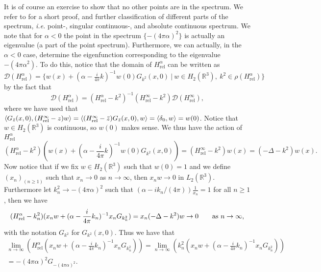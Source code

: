 \documentclass[a4paper,11pt]{article}
\newcommand{\dom}[1]{\mathscr D\left(#1\right)}
\newcommand{\ie}{\emph{i.e.} }
\newcommand{\R}{\mathbb{R}}
\begin{document}
It is of course an exercise to show that no other points are in the spectrum. We refer to \cite{albeverio2012solvable} for a short proof, and further classification of different parts of the spectrum, \ie point-, singular continuous-, and absolute continuous spectrum. 
We note that for $ \alpha<0 $ the point in the spectrum $ \{-(4\pi\alpha)^2\} $ is actually an eigenvalue (a part of the point spectrum). Furthermore, we can actually, in the $ \alpha<0 $ case, determine the eigenfunction corresponding to the eigenvalue $ -(4\pi\alpha^2) $. To do this, notice that the domain of $ H_{\text{rel}}^\alpha $ can be written as $ \dom{H_{\text{rel}}^\alpha}=\{w(x)+(\alpha-\frac{i}{4\pi}k)^{-1}w(0)G_{k^2}(x,0)\ |\ w\in H_2(\R^3),\ k^2\in\rho(H_{\text{rel}}^\alpha)\} $ by the fact that \begin{equation}
\dom{H_{\text{rel}}^\alpha}=(H_{\text{rel}}^\alpha-k^2)^{-1}(H_{\text{rel}}^\infty-k^2)\dom{H_{\text{rel}}^\infty},
\end{equation}
where we have used that $ \braket{G_{\bar{z}}(x,0),(H_{\text{rel}}^\infty-z)w}=\braket{(H_{\text{rel}}^\infty-\bar{z})G_{\bar{z}}(x,0),w}=\braket{\delta_0,w}=w(0) $. Notice that $ w\in H_2(\R^3) $ is continuous, so $ w(0) $ makes sense. We thus have the action of $ H_{\text{rel}}^\alpha $\begin{equation}
(H_{\text{rel}}^\alpha-k^2)(w(x)+(\alpha-\frac{i}{4\pi}k)^{-1}w(0)G_{k^2}(x,0))=(H_{\text{rel}}^\infty-k^2)w(x)=(-\Delta-k^2)w(x).
\end{equation}
Now notice that if we fix $ w\in H_2(\R^3) $ such that $ w(0)=1 $ and we define $ (x_n)_{(n\geq1)} $ such that $ x_n\to0 $ as $ n\to\infty $, then $ x_nw\to0 $ in $ L_2(\R^3) $. Furthermore let $ k_n^2\to-(4\pi\alpha)^2 $ such that $ \left(\alpha-ik_n/(4\pi)\right)\frac{1}{x_n}=1 $ for all $ n\geq1 $, then we have \begin{equation}
(H_{\text{rel}}^\alpha-k_n^2)(x_nw+(\alpha-\frac{i}{4\pi}k_n)^{-1}x_nG_{k_n^2})=x_n(-\Delta-k^2)w\to 0\qquad \text{as $ n\to\infty $},
\end{equation}
with the notation $ G_{k^2} $ for $ G_{k^2}(x,0) $. Thus we have that \begin{equation}
\begin{aligned}
\lim_{n\to\infty}\left(H_{\text{rel}}^\alpha(x_nw+(\alpha-\frac{i}{4\pi}k_n)^{-1}x_nG_{k_n^2})\right)=\lim\limits_{n\to\infty}\left(k_n^2(x_nw+(\alpha-\frac{i}{4\pi}k_n)^{-1}x_nG_{k_n^2})\right)\\= -(4\pi\alpha)^2G_{-(4\pi\alpha)^2}.
\end{aligned}
\end{equation}
\end{document}
